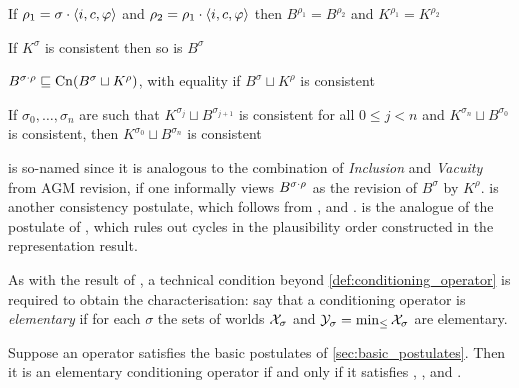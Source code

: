 \begin{postulate}[\duprem{}]
    If $\rho_1 = \sigma \cdot \langle {i, c, \varphi} \rangle$ and $\rho_2 = \rho_1
    \cdot \langle {i, c, \varphi} \rangle$ then $B^{\rho_1} = B^{\rho_2}$ and
    $K^{\rho_1} = K^{\rho_2}$
\end{postulate}
\begin{postulate}[\condcons{}]
    If $K^\sigma$ is consistent then so is $B^\sigma$
\end{postulate}
\begin{postulate}[\incvac{}]
    $B^{\sigma \cdot \rho} \sqsubseteq \operatorname{Cn}(B^\sigma \sqcup K^\rho)$, with
    equality if $B^\sigma \sqcup K^\rho$ is consistent
\end{postulate}
\begin{postulate}[\acyc{}]
    If $\sigma_0, \ldots, \sigma_n$ are such that $K^{\sigma_j} \sqcup
    B^{\sigma_{j+1}}$ is consistent for all $0 \le j < n$ and $K^{\sigma_n}
    \sqcup B^{\sigma_0}$ is consistent, then $K^{\sigma_0} \sqcup B^{\sigma_n}$
    is consistent
\end{postulate}

\incvac{} is so-named since it is analogous to the combination of
\emph{Inclusion} and \emph{Vacuity} from AGM revision, if one informally views
$B^{\sigma \cdot \rho}$ as the revision of $B^\sigma$ by $K^\rho$.
%
\condcons{} is another consistency postulate, which follows from
\consistency{},  \closure{} and \soundness{}.
%
\acyc{} is the analogue of the postulate of \citeauthor{delgrande2018general},
which rules out cycles in the plausibility order
constructed in the representation result.

As with the result of \citeauthor{delgrande2018general}, a technical condition beyond
\cref{def:conditioning_operator} is required to obtain the characterisation:
say that a conditioning operator is \emph{elementary} if for each $\sigma$ the
sets of worlds $\mathcal{X}_\sigma$ and $\mathcal{Y}_\sigma = \min_{\le}\mathcal{X}_\sigma$ are
elementary.\footnotemark{}
%

\begin{theorem}
    \label{thm:conditioning_characterisation}
    Suppose an operator satisfies the basic postulates of
    \cref{sec:basic_postulates}.\footnotemark{} Then it is an elementary
    conditioning operator if and only if it satisfies \duprem{},
    \condcons{}, \incvac{} and \acyc{}.

\end{theorem}

